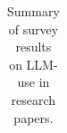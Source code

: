 \begin{table}
\begin{tabular}{lrlllrc}
\bottomrule
\end{tabular}
\caption{Summary of survey results on LLM-use in research papers.}
\label{tab:review_surveys}
\end{table}